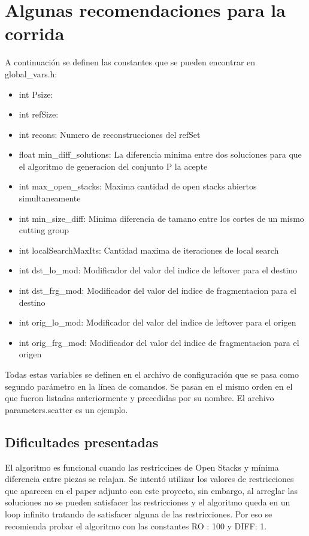 \documentclass[letter,10pt]{article}
\begin{document}
\section{Algunas recomendaciones para la corrida}

A continuación se definen las constantes que se pueden encontrar en global_vars.h:

\begin{itemize}
\item int Psize:
\item int refSize:
\item int recons: Numero de reconstrucciones del refSet
\item float min_diff_solutions: La diferencia minima entre dos soluciones 
  para que el algoritmo de generacion del conjunto P la acepte
\item int max_open_stacks: Maxima cantidad de open stacks abiertos simultaneamente
\item int min_size_diff:   Minima diferencia de tamano entre los cortes de un mismo cutting group
\item int localSearchMaxIts: Cantidad maxima de iteraciones de local search
\item int dst_lo_mod:    Modificador del valor del indice de leftover para el destino 
\item int dst_frg_mod:   Modificador del valor del indice de fragmentacion para el destino
\item int orig_lo_mod:   Modificador del valor del indice de leftover para el origen
\item int orig_frg_mod:  Modificador del valor del indice de fragmentacion para el origen
\end{itemize}

Todas estas variables se definen en el archivo de configuraci\'on que se pasa como segundo 
par\'ametro en la l\'inea de comandos. Se pasan en el mismo orden en el que fueron listadas
anteriormente y precedidas por su nombre. El archivo parameters.scatter es un ejemplo.
 
\subsection{Dificultades presentadas}

El algoritmo es funcional cuando las restriccines de Open Stacks y mínima diferencia entre piezas se relajan. 
Se intentó utilizar los valores de restricciones que aparecen en el paper adjunto con este proyecto, sin embargo,
al arreglar las soluciones no se pueden satisfacer las restricciones y el algoritmo queda en un loop infinito 
tratando de satisfacer alguna de las restricciones. Por eso se recomienda probar el algoritmo con las constantes 
RO : 100 y DIFF: 1. 
\end{document}
